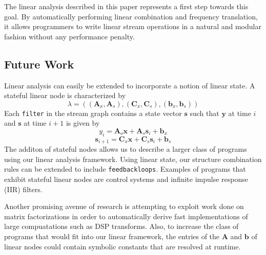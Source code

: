 The linear analysis described in this paper represents a first step
towards this goal.  By automatically performing linear combination and
frequency translation, it allows programmers to write linear stream
operations in a natural and modular fashion without any performance
penalty.

\subsection{Future Work}

Linear analysis can easily be extended to incorporate a notion of
linear state.  A stateful linear node is characterized by
\begin{equation} \nonumber
\lambda=(({\mathbf A}_x, {\mathbf A}_s), ({\mathbf C}_x, {\mathbf C}_s), 
({\mathbf b}_x, {\mathbf b}_s))
\end{equation}
Each {\tt filter} in the stream graph contains a state vector
${\mathbf s}$ such that ${\mathbf y}$ at time $i$ and ${\mathbf s}$ at
time $i+1$ is given by
\begin{equation} \nonumber
y_i={\mathbf A}_o{\mathbf x} + {\mathbf A}_s{\mathbf s}_i + {\mathbf b}_x
\end{equation}
\begin{equation} \nonumber
{\mathbf s}_{i+1}={\mathbf C}_x{\mathbf x} + {\mathbf C}_s{\mathbf s}_i + {\mathbf b}_s
\end{equation}
The additon of stateful nodes allows us to describe a larger class of programs 
using our linear analysis framework.
Using linear state, our structure combination rules can be extended to include {\tt feedbackloops}.
Examples of programs that exhibit stateful linear nodes are control systems
and infinite impulse response (IIR) filters.

Another promising avenue of research is attempting to exploit work
done on matrix factorizations in order to automatically derive fast
implementations of large compuatations such as DSP transforms.  Also,
to increase the class of programs that would fit into our linear
framework, the entries of the ${\mathbf A}$ and ${\mathbf b}$ of
linear nodes could contain symbolic constants that are resolved at
runtime.

